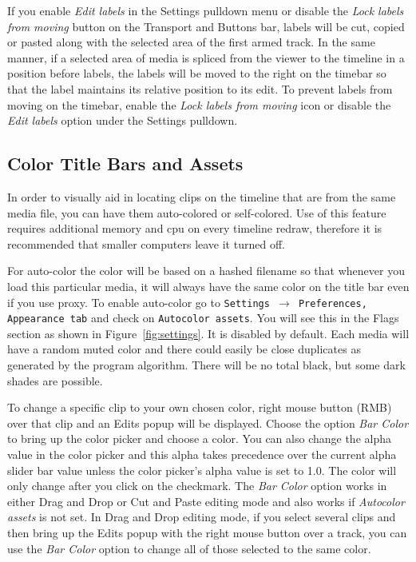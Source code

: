 If you enable \emph{Edit labels} in the Settings pulldown menu or disable the \emph{Lock labels from moving}
button on the Transport and Buttons bar, labels will be cut, copied or pasted along with the selected
area of the first armed track. 
In the same manner, if a selected area of media is spliced from the viewer to the timeline in a position 
before labels, the labels will be moved to the right on the timebar so that the label maintains its 
relative position to its edit. 
To prevent labels from moving on the timebar, enable the \emph{Lock labels from moving} icon or
disable the \emph{Edit labels} option under the Settings pulldown.

\subsection{Color Title Bars and Assets}%
\label{sub:color_title_bars_and_assets}

In order to visually aid in locating clips on the timeline that are from the same media file, you can have them auto-colored or self-colored.  
Use of this feature requires additional memory and cpu on every timeline redraw, therefore it is recommended that smaller computers leave it turned off.

For auto-color the color will be based on a hashed filename so that whenever you load this particular media, it will always have the same color on the title bar even if you use proxy.  
To enable auto-color go to \texttt{Settings $\rightarrow$ Preferences, Appearance tab} and check on \texttt{Autocolor assets}. You will see this in the Flags section
as shown in Figure~\ref{fig:settings}.  It is disabled by default.  
Each media will have a random muted color and there could easily be close duplicates as generated by the program algorithm.  There will be no total black, but some dark shades are possible.  

To change a specific clip to your own chosen color, right mouse button (RMB) over that clip and an Edits popup will be displayed.  
Choose the option \textit{Bar Color} to bring up the color picker and choose a color.   
You can also change the alpha value in the color picker and this alpha takes precedence over the current alpha slider bar value unless the color picker's alpha value is set to 1.0.   
The color will only change after you click on the checkmark.  
The \emph{Bar Color} option works in either Drag and Drop or Cut and Paste editing mode and also works if \textit{Autocolor assets} is not set.  
In Drag and Drop editing mode, if you select several clips and then bring up the Edits popup with the right mouse button over a track, you can use the \emph{Bar Color} option to change all of those selected to the same color.

